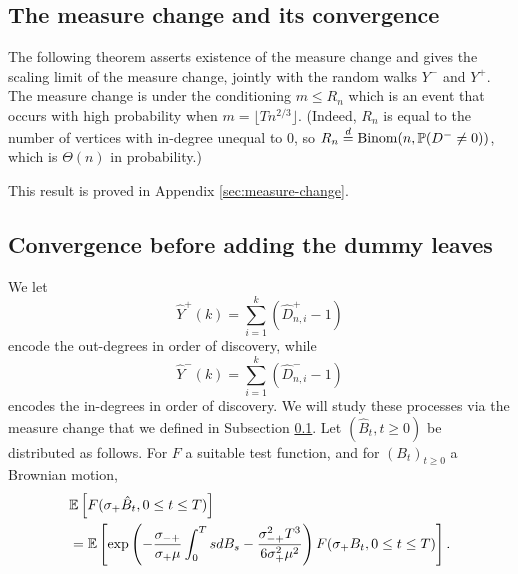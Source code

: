 \subsection{The measure change and its convergence}\label{subsec.measurechange}

The following theorem asserts existence of the measure change and gives the scaling limit of the measure change, jointly with the random walks $Y^-$ and $Y^+$. The measure change is under the conditioning $m \leq R_n$ which is an event that occurs with high probability when $m =\lfloor T n^{2/3}\rfloor$. (Indeed, $R_n$ is equal to the number of vertices with in-degree unequal to $0$, so $R_n\overset{d}{=}\mathrm{Binom}(n,\P(D^-\neq 0))$, which is $\Theta(n)$ in probability.)



This result is proved in Appendix \ref{sec:measure-change}. 

\subsection{Convergence before adding the dummy leaves}
We let
$$ \hat{Y}^+(k)=\sum\limits_{i=1}^k (\hat{D}^+_{n,i}-1)$$
encode the out-degrees in order of discovery, while 
$$ \hat{Y}^-(k)=\sum\limits_{i=1}^k (\hat{D}^-_{n,i}-1)$$
encodes the in-degrees in order of discovery.
 We will study these processes via the measure change that we defined in Subsection \ref{subsec.measurechange}. Let $(\hat{B}_t,t\geq 0)$ be distributed as follows. For $F$ a suitable test function, and for $(B_t)_{t\geq 0}$ a Brownian motion,
\begin{align*} &\E\left[F(\sigma_+ \hat{B}_t,0\leq t \leq T)\right]\\&=\E\left[\exp\left(-\frac{\sigma_{-+}}{\sigma_+ \mu} \int_0^T s dB_s -\frac{\sigma_{-+}^2 T^3}{6\sigma_+^2 \mu^2}\right)F(\sigma_+ B_t,   0\leq t \leq T)\right].\end{align*}

 

